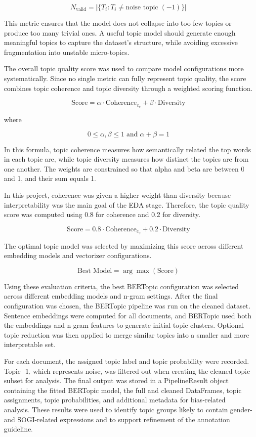 \documentclass[12pt,oneside,openright,a4paper]{cpe-english-project}
\begin{document}
\[N_{\text{valid}} = |\{T_i : T_i \neq \text{noise topic } (-1)\}|\]

This metric ensures that the model does not collapse into too few topics or produce too many trivial ones. A useful topic model should generate enough meaningful topics to capture the dataset's structure, while avoiding excessive fragmentation into unstable micro-topics.

The overall topic quality score was used to compare model configurations more systematically. Since no single metric can fully represent topic quality, the score combines topic coherence and topic diversity through a weighted scoring function.

\[\text{Score} = \alpha \cdot \text{Coherence}_{c_v} + \beta \cdot \text{Diversity}\]

where

\[0 \leq \alpha, \beta \leq 1 \text{ and } \alpha + \beta = 1\]

In this formula, topic coherence measures how semantically related the top words in each topic are, while topic diversity measures how distinct the topics are from one another. The weights are constrained so that alpha and beta are between 0 and 1, and their sum equals 1.

In this project, coherence was given a higher weight than diversity because interpretability was the main goal of the EDA stage. Therefore, the topic quality score was computed using 0.8 for coherence and 0.2 for diversity.

\[\text{Score} = 0.8 \cdot \text{Coherence}_{c_v} + 0.2 \cdot \text{Diversity}\]

The optimal topic model was selected by maximizing this score across different embedding models and vectorizer configurations.

\[\text{Best Model} = \arg\max(\text{Score})\]

Using these evaluation criteria, the best BERTopic configuration was selected across different embedding models and n-gram settings. After the final configuration was chosen, the BERTopic pipeline was run on the cleaned dataset. Sentence embeddings were computed for all documents, and BERTopic used both the embeddings and n-gram features to generate initial topic clusters. Optional topic reduction was then applied to merge similar topics into a smaller and more interpretable set.

For each document, the assigned topic label and topic probability were recorded. Topic -1, which represents noise, was filtered out when creating the cleaned topic subset for analysis. The final output was stored in a PipelineResult object containing the fitted BERTopic model, the full and cleaned DataFrames, topic assignments, topic probabilities, and additional metadata for bias-related analysis. These results were used to identify topic groups likely to contain gender- and SOGI-related expressions and to support refinement of the annotation guideline.
\end{document}
